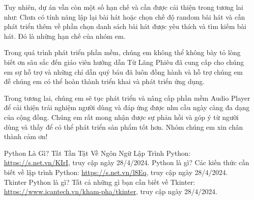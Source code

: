\documentclass[a4paper]{article}
\begin{document}
\hspace Tuy nhiên, dự án vẫn còn một số hạn chế và cần được cải thiện trong tương lai như: Chưa có tính năng lập lại bài hát hoặc chọn chế độ random bài hát và cần phát triển thêm về phần chọn danh sách bài hát được yêu thích và tìm kiếm bài hát. Đó là những hạn chế của nhóm em.

\hspace Trong quá trình phát triển phần mềm, chúng em  không thể không bày tỏ lòng biết ơn sâu sắc đến giáo viên hướng dẫn  Từ Lãng Phiêu đã cung cấp cho chúng em sự hỗ trợ và những chỉ dẫn quý báu đã luôn đồng hành và hỗ trợ chúng em đễ chúng em có thể hoàn thành triển khai và phát triển ứng dụng.

\hspace Trong tương lai, chúng em sẽ tục phát triển và nâng cấp phần mềm Audio Player để cải thiện trải nghiệm người dùng và đáp ứng được nhu cầu ngày càng đa dạng của cộng đồng. Chúng em rất mong nhận được sự phản hồi và góp ý từ người dùng và thầy để có thể phát triển sản phẩm tốt hơn. Nhóm chúng em xin chân thành cảm ơn!
\newpage
\begin{thebibliography}{80}

Python Là Gì? Tất Tần Tật Về Ngôn Ngữ Lập Trình Python:
\href{https://s.net.vn/KIrI}{https://s.net.vn/KIrI}, truy cập ngày 28/4/2024.
Python là gì? Các kiến thức cần biết về lập trình Python:
\href{https://s.net.vn/l8Eq}{https://s.net.vn/l8Eq}, truy cập ngày 28/4/2024.
Tkinter Python là gì? Tất cả những gì bạn cần biết về Tkinter:
\href{https://www.icantech.vn/kham-pha/tkinter}{https://www.icantech.vn/kham-pha/tkinter}, truy cập ngày 28/4/2024.
\end{thebibliography}
\end{document}
